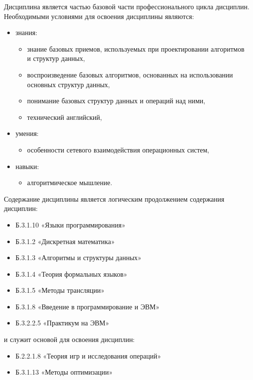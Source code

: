 Дисциплина \thecourse{} является частью базовой части профессионального цикла дисциплин.
Необходимыми условиями для освоения дисциплины являются:
\begin{itemize}
\item знания:
\begin{itemize}
\item знание базовых приемов, используемых при проектировании алгоритмов и структур данных,\item воспроизведение базовых алгоритмов, основанных на использовании основных структур данных,\item понимание базовых структур данных и операций над ними,\item технический английский,
\end{itemize}
\item умения:
\begin{itemize}
\item особенности сетевого взаимодействия операционных систем,
\end{itemize}
\item навыки:
\begin{itemize}
\item алгоритмическое мышление.
\end{itemize}
\end{itemize}


Содержание дисциплины является логическим продолжением содержания дисциплин: \begin{itemize}
\item Б.3.1.10 «Языки программирования»\item Б.3.1.2 «Дискретная математика»\item Б.3.1.3 «Алгоритмы и структуры данных»\item Б.3.1.4 «Теория формальных языков»\item Б.3.1.5 «Методы трансляции»\item Б.3.1.8 «Введение в программирование и ЭВМ»\item Б.3.2.2.5 «Практикум на ЭВМ»
\end{itemize} и служит основой для освоения дисциплин: \begin{itemize}
\item Б.2.2.1.8 «Теория игр и исследования операций»\item Б.3.1.13 «Методы оптимизации»
\end{itemize}


